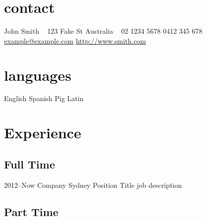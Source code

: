 \documentclass[a4paper,english]{friggeri-cv} %
\begin{document}
 
 



\begin{aside} %
\section{contact}
John Smith
~
123 Fake St
Australia
~ 
02 1234 5678
0412 345 678
~  
\href{mailto:example@example.com}{example@example.com}
\href{http://www.smith.com}{http://www.smith.com}
~
~
\section{languages}
English
Spanish
Pig Latin
\end{aside}

 





\section{Experience}
 
\subsection{Full Time}

\begin{entrylist}


\entry 
{2012--Now}
{Company}
{Sydney}%
{Position Title}
{
job description
}


\end{entrylist}

\subsection{Part Time}
\end{document}
